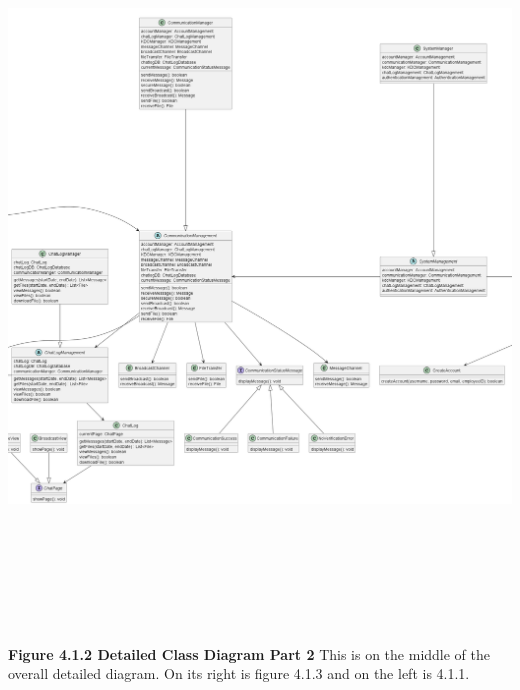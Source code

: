 \documentclass[]{article}
\begin{document}
\begin{center}
	\includegraphics[width=\textwidth,height=8in]{../images/ClassDiagram/mid.png}
	\textbf{Figure 4.1.2 Detailed Class Diagram Part 2}
	\newline This is on the middle of the overall detailed diagram. On its right is figure 4.1.3 and on the left is 4.1.1.

\end{center}
\end{document}
